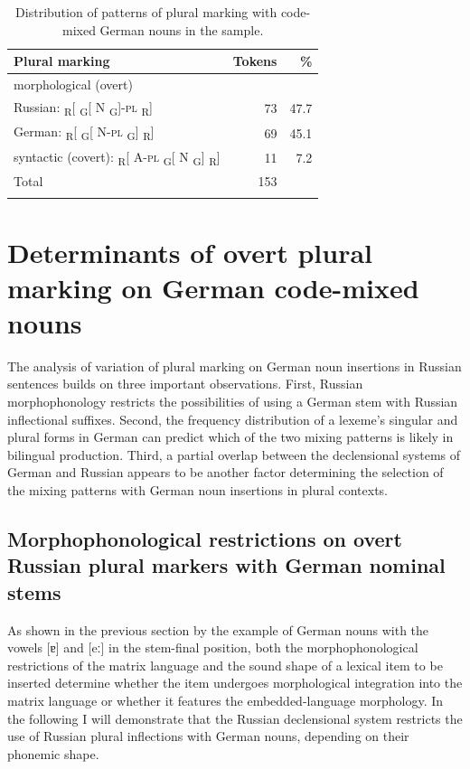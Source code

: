 \begin{table}
\begin{tabular}{l rr}
    \lsptoprule
	Plural marking & Tokens & \% \\\midrule
	morphological (overt) & & \\
	\hspace{10mm} Russian: {\textsubscript{R}[  \textsubscript{G}[ N \textsubscript{G}]-\textsc{pl} \textsubscript{R}]} & 73 & 47.7\\
	\hspace{10mm} German: {\textsubscript{R}[ \textsubscript{G}[ N-\textsc{pl} \textsubscript{G}] \textsubscript{R}]} & 69 & 45.1\\
	syntactic (covert): {\textsubscript{R}[ A-\textsc{pl} \textsubscript{G}[ N \textsubscript{G}] \textsubscript{R}]} & 11 & 7.2\\ 				
	Total & 153 & \\ 
    \lspbottomrule
	\end{tabular}
	\caption{Distribution of patterns of plural marking with code-mixed German nouns in the sample.}
\label{tab:6:3}
\end{table}

\section{Determinants of overt plural marking on German code-mixed nouns}\label{morphophonology}

The analysis of variation of plural marking on German noun insertions in Russian sentences builds on three important observations. First, Russian morphophonology restricts the possibilities of using a German stem with Russian inflectional suffixes. Second, the frequency distribution of a lexeme’s singular and plural forms in German can predict which of the two mixing patterns is likely in bilingual production. Third, a partial overlap between the declensional systems of German and Russian appears to be another factor determining the selection of the mixing patterns with German noun insertions in plural contexts.

\subsection{Morphophonological restrictions on overt Russian plural markers with German nominal stems}{\label{morph-restr}}

As shown in the previous section by the example of German nouns with the vowels [ɐ] and [eː] in the stem-final position, both the morphophonological restrictions of the matrix language and the sound shape of a lexical item to be inserted determine whether the item undergoes morphological integration into the matrix language or whether it features the embedded-language morphology. In the following I will demonstrate that the Russian declensional system restricts the use of Russian plural inflections with German nouns, depending on their phonemic shape.

